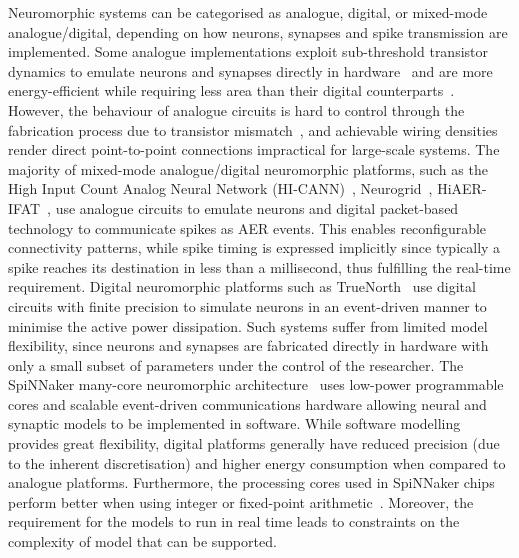 Neuromorphic systems can be categorised as analogue, digital, or mixed-mode analogue/digital, depending on how neurons, synapses and spike transmission are implemented. %
Some analogue implementations exploit sub-threshold transistor dynamics to emulate neurons and synapses directly in hardware~\cite{indiveri2011neuromorphic} and are more energy-efficient while requiring less area than their digital counterparts~\cite{joubert2012hardware}. However, the behaviour of analogue circuits is hard to control through the fabrication process due to transistor mismatch~\cite{indiveri2011neuromorphic,pedram2006thermal,linares2003compact}, and achievable wiring densities render direct point-to-point connections impractical for large-scale systems. The majority of mixed-mode analogue/digital neuromorphic platforms, such as the High Input Count Analog Neural Network (HI-CANN)~\cite{schemmel2010wafer}, Neurogrid~\cite{benjamin2014neurogrid}, HiAER-IFAT~\cite{yu201265k}, use analogue circuits to emulate neurons and digital packet-based technology to communicate spikes as AER events. This enables reconfigurable connectivity patterns, while spike timing is expressed implicitly since typically a spike reaches its destination in less than a millisecond, thus fulfilling the real-time requirement. Digital neuromorphic platforms such as TrueNorth~\cite{merolla2014million} use digital circuits with finite precision to simulate neurons in an event-driven manner to minimise the active power dissipation. Such systems suffer from limited model flexibility, since neurons and synapses are fabricated directly in hardware with only a small subset of parameters under the control of the researcher. 
The SpiNNaker many-core neuromorphic architecture~\cite{furber2014spinnaker} uses low-power programmable cores and scalable event-driven communications hardware allowing neural and synaptic models to be implemented in software.
While software modelling provides great flexibility, digital platforms generally have reduced precision (due to the inherent discretisation) and higher energy consumption when compared to analogue platforms. Furthermore, the processing cores used in SpiNNaker chips perform better when using integer or fixed-point arithmetic~\cite{Hopkins2015Accuracy}.
Moreover, the requirement for the models to run in real time leads to constraints on the complexity of model that can be supported.

